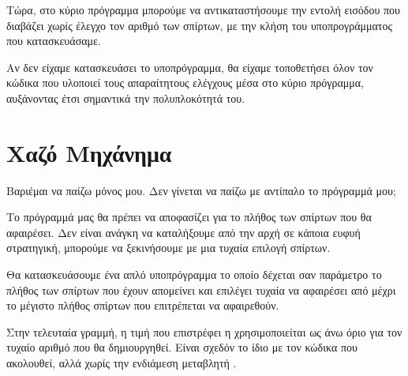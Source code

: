 \documentclass[a4paper,11pt,oneside]{book}
\begin{document}

Τώρα, στο κύριο πρόγραμμα μπορούμε να αντικαταστήσουμε την εντολή εισόδου που διαβάζει χωρίς έλεγχο τον αριθμό των σπίρτων, με την κλήση του υποπρογράμματος που κατασκευάσαμε.


Αν δεν είχαμε κατασκευάσει το υποπρόγραμμα, θα είχαμε τοποθετήσει όλον τον κώδικα που υλοποιεί τους απαραίτητους ελέγχους μέσα στο κύριο πρόγραμμα, αυξάνοντας έτσι σημαντικά την πολυπλοκότητά του. 


\section{Χαζό Μηχάνημα}

\begin{question}
Βαριέμαι να παίζω μόνος μου. Δεν γίνεται να παίζω με αντίπαλο το πρόγραμμά μου;
\end{question}

Το πρόγραμμά μας θα πρέπει να αποφασίζει για το πλήθος των σπίρτων που θα αφαιρέσει. Δεν είναι ανάγκη να καταλήξουμε από την αρχή σε κάποια ευφυή στρατηγική, μπορούμε να ξεκινήσουμε με μια τυχαία επιλογή σπίρτων. 

Θα κατασκευάσουμε ένα απλό υποπρόγραμμα το οποίο δέχεται σαν παράμετρο το πλήθος των σπίρτων που έχουν απομείνει και επιλέγει τυχαία να αφαιρέσει από  μέχρι το μέγιστο πλήθος σπίρτων που επιτρέπεται να αφαιρεθούν.



Στην τελευταία γραμμή, η τιμή που επιστρέφει η  χρησιμοποιείται ως άνω όριο για τον τυχαίο αριθμό που θα δημιουργηθεί. Είναι σχεδόν το ίδιο με τον κώδικα που ακολουθεί, αλλά χωρίς την ενδιάμεση μεταβλητή .
\end{document}
